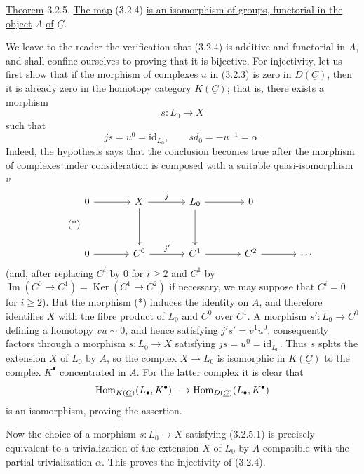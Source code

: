 \underline{Theorem} 3.2.5. \underline{The map} (3.2.4)
\underline{is an isomorphism of groups, functorial in the object}
$A$ \underline{of} $\underline C$.

We leave to the reader the verification that (3.2.4) is additive and
functorial in $A$, and shall confine ourselves to proving that it is
bijective. For injectivity, let us first show that if the morphism of
complexes $u$ in (3.2.3) is zero in $D(\underline C)$, then it is
already zero in the homotopy category $K(\underline C)$; that is,
there exists a morphism
\[
 s:L_0\longrightarrow X
\]
such that
\begin{equation}\tag{3.2.5.1}
 js=u^0=\mathrm{id}_{L_0},
 \qquad sd_0=-u^{-1}=\alpha.
\end{equation}
Indeed, the hypothesis says that the conclusion becomes true after
the morphism of complexes under consideration is composed with a
suitable quasi-isomorphism $v$
\begin{equation}\tag{*}
\begin{tikzcd}[column sep=large,row sep=huge]
 0\arrow[r] & X\arrow[r,"j"]\arrow[d]
 & L_0\arrow[r]\arrow[d] & 0\\
 0\arrow[r] & C^0\arrow[r,"j'"] & C^1\arrow[r] & C^2\arrow[r] & \cdots
\end{tikzcd}
\end{equation}
(and, after replacing $C^i$ by $0$ for $i\geq2$ and $C^1$ by
$\operatorname{Im}(C^0\longrightarrow C^1)
=\operatorname{Ker}(C^1\longrightarrow C^2)$ if necessary, we may
suppose that $C^i=0$ for $i\geq2$). But the morphism (*) induces the
identity on $A$, and therefore identifies $X$ with the fibre product
of $L_0$ and $C^0$ over $C^1$. A morphism
$s':L_0\longrightarrow C^0$ defining a homotopy $vu\sim0$, and hence
satisfying $j's'=v^1u^0$, consequently factors through a morphism
$s:L_0\longrightarrow X$ satisfying
$js=u^0=\mathrm{id}_{L_0}$. Thus $s$ splits the extension $X$ of
$L_0$ by $A$, so the complex $X\longrightarrow L_0$ is isomorphic
\underline{in} $K(\underline C)$ to the complex $K^\bullet$
concentrated in $A$. For the latter complex it is clear that
\[
 \Hom_{K(\underline C)}(L_\bullet,K^\bullet)
 \longrightarrow
 \Hom_{D(\underline C)}(L_\bullet,K^\bullet)
\]
is an isomorphism, proving the assertion.

Now the choice of a morphism $s:L_0\longrightarrow X$ satisfying
(3.2.5.1) is precisely equivalent to a trivialization of the
extension $X$ of $L_0$ by $A$ compatible with the partial
trivialization $\alpha$. This proves the injectivity of (3.2.4).

